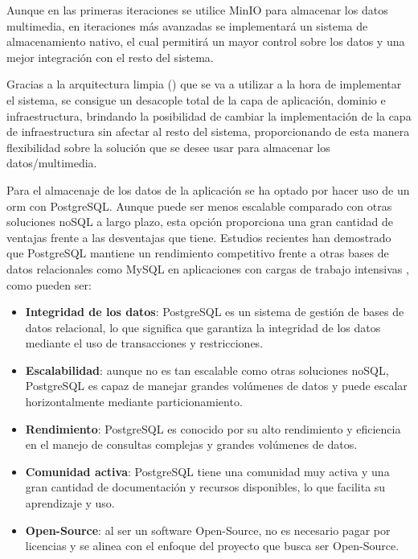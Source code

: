 Aunque en las primeras iteraciones se utilice MinIO para almacenar los datos multimedia, en iteraciones más avanzadas se implementará un sistema de almacenamiento nativo, el cual permitirá un mayor control sobre los datos y una mejor integración con el resto del sistema.

Gracias a la arquitectura limpia (\cite{uncle-bob-clean-architecture}) que se va a utilizar a la hora de implementar el sistema, se consigue un desacople total de la capa de aplicación, dominio e infraestructura, brindando la posibilidad de cambiar la implementación de la capa de infraestructura sin afectar al resto del sistema, proporcionando de esta manera flexibilidad sobre la solución que se desee usar para almacenar los datos/multimedia.

Para el almacenaje de los datos de la aplicación se ha optado por hacer uso de un \acrshort{orm} con PostgreSQL.
Aunque puede ser menos escalable comparado con otras soluciones noSQL a largo plazo, esta opción proporciona una gran cantidad de ventajas frente a las desventajas que tiene. Estudios recientes han demostrado que PostgreSQL mantiene un rendimiento competitivo frente a otras bases de datos relacionales como MySQL en aplicaciones con cargas de trabajo intensivas \parencite{salunke2024performance}, como pueden ser:
\begin{itemize}
    \item \textbf{Integridad de los datos}: PostgreSQL es un sistema de gestión de bases de datos relacional, lo que significa que garantiza la integridad de los datos mediante el uso de transacciones y restricciones.
    \item \textbf{Escalabilidad}: aunque no es tan escalable como otras soluciones noSQL, PostgreSQL es capaz de manejar grandes volúmenes de datos y puede escalar horizontalmente mediante particionamiento.
    \item \textbf{Rendimiento}: PostgreSQL es conocido por su alto rendimiento y eficiencia en el manejo de consultas complejas y grandes volúmenes de datos.
    \item \textbf{Comunidad activa}: PostgreSQL tiene una comunidad muy activa y una gran cantidad de documentación y recursos disponibles, lo que facilita su aprendizaje y uso.
    \item \textbf{Open-Source}: al ser un software Open-Source, no es necesario pagar por licencias y se alinea con el enfoque del proyecto que busca ser Open-Source.
\end{itemize}

